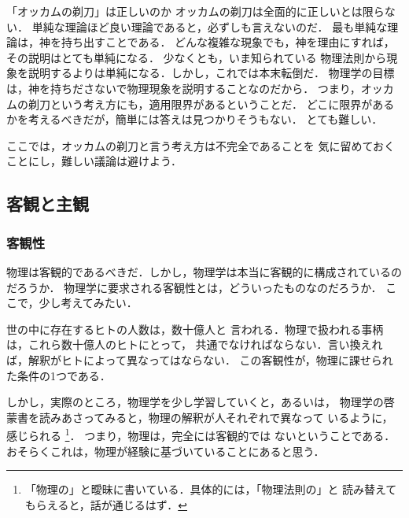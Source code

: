             \begin{memo}{「オッカムの剃刀」は正しいのか}
                オッカムの剃刀は全面的に正しいとは限らない．
                単純な理論ほど良い理論であると，必ずしも言えないのだ．
                最も単純な理論は，神を持ち出すことである．
                どんな複雑な現象でも，神を理由にすれば，その説明はとても単純になる．
                少なくとも，いま知られている
                物理法則から現象を説明するよりは単純になる．しかし，これでは本末転倒だ．
                物理学の目標は，神を持ちださないで物理現象を説明することなのだから．
                つまり，オッカムの剃刀という考え方にも，適用限界があるということだ．
                どこに限界があるかを考えるべきだが，簡単には答えは見つかりそうもない．
                とても難しい．

                ここでは，オッカムの剃刀と言う考え方は不完全であることを
                気に留めておくことにし，難しい議論は避けよう．
            \end{memo}


        \subsection{客観と主観}
            \subsubsection{客観性}
                物理は客観的であるべきだ．しかし，物理学は本当に客観的に構成されているのだろうか．
                物理学に要求される客観性とは，どういったものなのだろうか．
                ここで，少し考えてみたい．

                世の中に存在するヒトの人数は，数十億人と
                言われる．物理で扱われる事柄は，これら数十億人のヒトにとって，
                共通でなければならない．言い換えれば，解釈がヒトによって異なってはならない．
                この客観性が，物理に課せられた条件の1つである．

                しかし，実際のところ，物理学を少し学習していくと，あるいは，
                物理学の啓蒙書を読みあさってみると，物理の解釈が人それぞれで異なって
                いるように，感じられる
                    \footnote{
                        「物理の」と曖昧に書いている．具体的には，「物理法則の」と
                        読み替えてもらえると，話が通じるはず．
                    }．
                つまり，物理は，完全には客観的では
                ないということである．おそらくこれは，物理が経験に基づいていることにあると思う．

